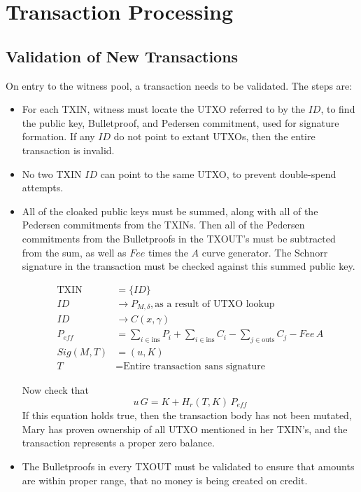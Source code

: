 \documentclass[a4paper, 10pt, conference]{ieeeconf}
\begin{document}
\section{Transaction Processing}
\subsection{Validation of New Transactions}
On entry to the witness pool, a transaction needs to be validated. The steps are:
\begin{itemize}
\item{For each TXIN, witness must locate the UTXO referred to by the $\mathit{ID}$, to find the public key, Bulletproof, and Pedersen commitment, used for signature formation. If any $\mathit{ID}$ do not point to extant UTXOs, then the entire transaction is invalid.}
\item{No two TXIN $\mathit{ID}$ can point to the same UTXO, to prevent double-spend attempts.}
\item{All of the cloaked public keys must be summed, along with all of the Pedersen commitments from the TXINs. Then all of the Pedersen commitments from the Bulletproofs in the TXOUT's must be subtracted from the sum, as well as $\mathit{Fee}$ times the $A$ curve generator. The Schnorr signature in the transaction must be checked against this summed public key.

\begin{align}
\text{TXIN} &= \{ID\} \\
ID &\rightarrow P_{M, \delta}, \text{as a result of UTXO lookup}\\
ID &\rightarrow C(x, \gamma)\\
P_{eff} &= \sum_{i \in \text{ins}}{P_i} + \sum_{i \in \text{ins}}{C_i}  - \sum_{j \in \text{outs}}{C_j} - Fee\,A\\
Sig(M, T) &= (u, K)\\
T &= \text{Entire transaction sans signature}
\end{align}

Now check that
$$u \, G = K + H_r(T, K) \, P_{\mathit{eff}}$$
If this equation holds true, then the transaction body has not been mutated, Mary has proven ownership of all UTXO mentioned in her TXIN's, and the transaction represents a proper zero balance.}
\item{The Bulletproofs in every TXOUT must be validated to ensure that amounts are within proper range, that no money is being created on credit.}
\end{itemize}
\end{document}
